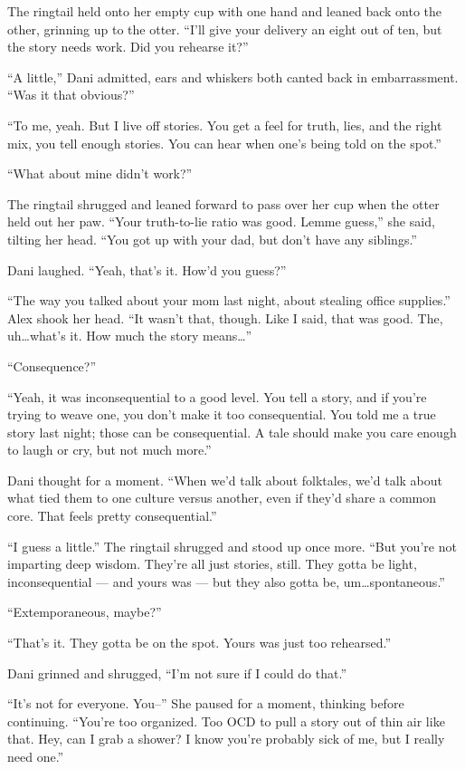 The ringtail held onto her empty cup with one hand and leaned back onto the other, grinning up to the otter. ``I'll give your delivery an eight out of ten, but the story needs work. Did you rehearse it?''

``A little,'' Dani admitted, ears and whiskers both canted back in embarrassment. ``Was it that obvious?''

``To me, yeah. But I live off stories. You get a feel for truth, lies, and the right mix, you tell enough stories. You can hear when one's being told on the spot.''

``What about mine didn't work?''

The ringtail shrugged and leaned forward to pass over her cup when the otter held out her paw. ``Your truth-to-lie ratio was good. Lemme guess,'' she said, tilting her head. ``You got up with your dad, but don't have any siblings.''

Dani laughed. ``Yeah, that's it. How'd you guess?''

``The way you talked about your mom last night, about stealing office supplies.'' Alex shook her head. ``It wasn't that, though. Like I said, that was good. The, uh\ldots{}what's it. How much the story means\ldots{}''

``Consequence?''

``Yeah, it was inconsequential to a good level. You tell a story, and if you're trying to weave one, you don't make it too consequential. You told me a true story last night; those can be consequential. A tale should make you care enough to laugh or cry, but not much more.''

Dani thought for a moment. ``When we'd talk about folktales, we'd talk about what tied them to one culture versus another, even if they'd share a common core. That feels pretty consequential.''

``I guess a little.'' The ringtail shrugged and stood up once more. ``But you're not imparting deep wisdom. They're all just stories, still. They gotta be light, inconsequential --- and yours was --- but they also gotta be, um\ldots{}spontaneous.''

``Extemporaneous, maybe?''

``That's it. They gotta be on the spot. Yours was just too rehearsed.''

Dani grinned and shrugged, ``I'm not sure if I could do that.''

``It's not for everyone. You--'' She paused for a moment, thinking before continuing. ``You're too organized. Too OCD to pull a story out of thin air like that. Hey, can I grab a shower? I know you're probably sick of me, but I really need one.''

